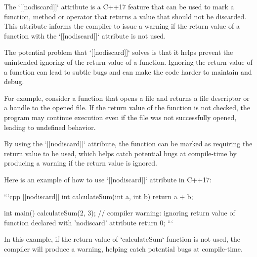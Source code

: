 The `[[nodiscard]]` attribute is a C++17 feature that can be used to mark a function, method or operator that returns a value that should not be discarded. This attribute informs the compiler to issue a warning if the return value of a function with the `[[nodiscard]]` attribute is not used. 

The potential problem that `[[nodiscard]]` solves is that it helps prevent the unintended ignoring of the return value of a function. Ignoring the return value of a function can lead to subtle bugs and can make the code harder to maintain and debug. 

For example, consider a function that opens a file and returns a file descriptor or a handle to the opened file. If the return value of the function is not checked, the program may continue execution even if the file was not successfully opened, leading to undefined behavior. 

By using the `[[nodiscard]]` attribute, the function can be marked as requiring the return value to be used, which helps catch potential bugs at compile-time by producing a warning if the return value is ignored. 

Here is an example of how to use `[[nodiscard]]` attribute in C++17:

```cpp
[[nodiscard]] int calculateSum(int a, int b) {
    return a + b;
}

int main() {
    calculateSum(2, 3); // compiler warning: ignoring return value of function declared with 'nodiscard' attribute
    return 0;
}
```

In this example, if the return value of `calculateSum` function is not used, the compiler will produce a warning, helping catch potential bugs at compile-time.
